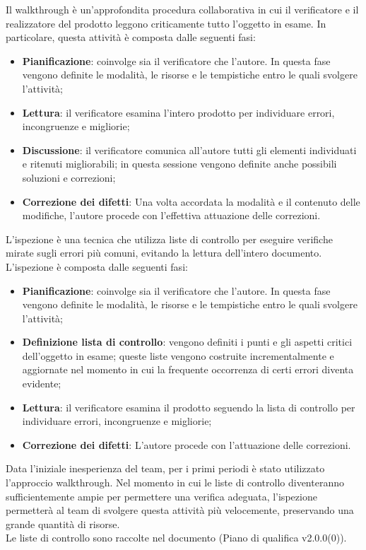 \documentclass[10pt, a4paper]{article}
\begin{document}
 Il walkthrough è un'approfondita procedura collaborativa in cui il verificatore e il realizzatore del prodotto leggono criticamente tutto l'oggetto in esame. In particolare, questa attività è composta dalle seguenti fasi:
\begin{itemize}
    \item \textbf{Pianificazione}: coinvolge sia il verificatore che l'autore. In questa fase vengono definite le modalità, le risorse e le tempistiche entro le quali svolgere l'attività;
    \item \textbf{Lettura}: il verificatore esamina l'intero prodotto per individuare errori, incongruenze e migliorie;
    \item \textbf{Discussione}: il verificatore comunica all'autore tutti gli elementi individuati e ritenuti migliorabili; in questa sessione vengono definite anche possibili soluzioni e correzioni;
    \item \textbf{Correzione dei difetti}: Una volta accordata la modalità e il contenuto delle modifiche, l'autore procede con l'effettiva attuazione delle correzioni.
\end{itemize}

 L'ispezione è una tecnica che utilizza liste di controllo per eseguire verifiche mirate sugli errori più comuni, evitando la lettura dell'intero documento. L'ispezione è composta dalle seguenti fasi:
\begin{itemize}
    \item \textbf{Pianificazione}: coinvolge sia il verificatore che l'autore. In questa fase vengono definite le modalità, le risorse e le tempistiche entro le quali svolgere l'attività;
    \item \textbf{Definizione lista di controllo}: vengono definiti i punti e gli aspetti critici dell'oggetto in esame; queste liste vengono costruite incrementalmente e aggiornate nel momento in cui la frequente occorrenza di certi errori diventa evidente;
    \item \textbf{Lettura}: il verificatore esamina il prodotto seguendo la lista di controllo per individuare errori, incongruenze e migliorie;
    \item \textbf{Correzione dei difetti}: L'autore procede con l'attuazione delle correzioni.
\end{itemize}

Data l'iniziale inesperienza del team, per i primi periodi è stato utilizzato l'approccio walkthrough.
Nel momento in cui le liste di controllo diventeranno sufficientemente ampie per permettere una verifica adeguata, l'ispezione permetterà al team di svolgere questa attività più velocemente, preservando una grande quantità di risorse.\\
Le liste di controllo sono raccolte nel documento (Piano di qualifica v2.0.0(0)).
\end{document}
